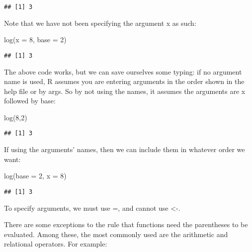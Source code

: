 \documentclass[
]{article}
\newenvironment{Shaded}{\begin{snugshade}}{\end{snugshade}}
\newcommand{\AttributeTok}[1]{\textcolor[rgb]{0.77,0.63,0.00}{#1}}
\newcommand{\DecValTok}[1]{\textcolor[rgb]{0.00,0.00,0.81}{#1}}
\newcommand{\FunctionTok}[1]{\textcolor[rgb]{0.00,0.00,0.00}{#1}}
\newcommand{\NormalTok}[1]{#1}
\begin{document}
\begin{verbatim}
## [1] 3
\end{verbatim}

Note that we have not been specifying the argument x as such:

\begin{Shaded}
\begin{Highlighting}[]
\FunctionTok{log}\NormalTok{(}\AttributeTok{x =} \DecValTok{8}\NormalTok{, }\AttributeTok{base =} \DecValTok{2}\NormalTok{)}
\end{Highlighting}
\end{Shaded}

\begin{verbatim}
## [1] 3
\end{verbatim}

The above code works, but we can save ourselves some typing: if no
argument name is used, R assumes you are entering arguments in the order
shown in the help file or by args. So by not using the names, it assumes
the arguments are x followed by base:

\begin{Shaded}
\begin{Highlighting}[]
\FunctionTok{log}\NormalTok{(}\DecValTok{8}\NormalTok{,}\DecValTok{2}\NormalTok{)}
\end{Highlighting}
\end{Shaded}

\begin{verbatim}
## [1] 3
\end{verbatim}

If using the arguments' names, then we can include them in whatever
order we want:

\begin{Shaded}
\begin{Highlighting}[]
\FunctionTok{log}\NormalTok{(}\AttributeTok{base =} \DecValTok{2}\NormalTok{, }\AttributeTok{x =} \DecValTok{8}\NormalTok{)}
\end{Highlighting}
\end{Shaded}

\begin{verbatim}
## [1] 3
\end{verbatim}

To specify arguments, we must use =, and cannot use \textless-.

There are some exceptions to the rule that functions need the
parentheses to be evaluated. Among these, the most commonly used are the
arithmetic and relational operators. For example:
\end{document}
